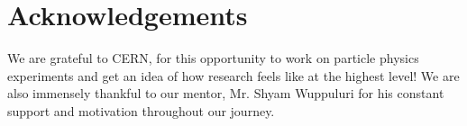 \section{\textbf{Acknowledgements}}
    \hspace{5mm} We are grateful to CERN, for this opportunity to work on particle physics experiments and get an idea of how research feels like at the highest level!  We are also immensely thankful to our mentor, Mr. Shyam Wuppuluri for his constant support and motivation throughout our journey. 
